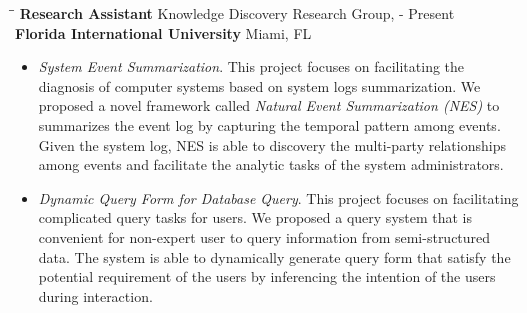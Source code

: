 \documentclass{res}
\begin{document}
\begin{resume}
   \begin{tabbing}
   \hspace{1.6in}\= \hspace{3.3in}\= \kill %
    {\bf Research Assistant} \>Knowledge Discovery Research Group,      - Present\\
                                \> \textbf{Florida International University}    \>Miami, FL\\
   \end{tabbing}      %
   \vspace{-5pt}
   \begin{itemize}
    \item \emph{System Event Summarization}.
    This project focuses on facilitating the diagnosis of computer systems based on system logs summarization. 
	We proposed a novel framework called \emph{Natural Event Summarization (NES)} to summarizes the event log by capturing the temporal pattern among events. 
	Given the system log, NES is able to discovery the multi-party relationships among events and facilitate the analytic tasks of the system administrators.

    \item \emph{Dynamic Query Form for Database Query}.
    This project focuses on facilitating complicated query tasks for users. 
	We proposed a query system that is convenient for non-expert user to query information from semi-structured data.
    The system is able to dynamically generate query form that satisfy the potential requirement of the users by inferencing the intention of the users during interaction.
   \end{itemize}



\end{resume}
\end{document}
